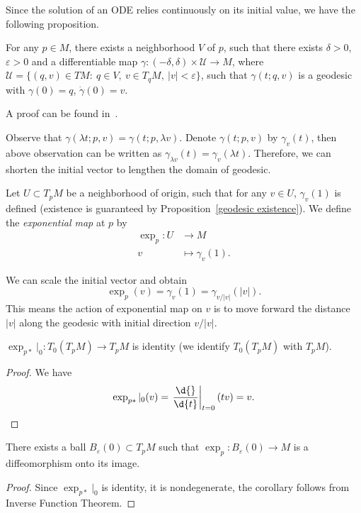 Since the solution of an ODE relies continuously on its initial value, we have the following proposition.
\begin{prop}\label{geodesic existence}
    For any $p\in M$, there exists a neighborhood $V$ of $p$, such that there exists $\delta>0$, $\varepsilon>0$ and a differentiable map $\gamma:(-\delta,\delta)\times\mathscr{U}\to M$, where $\mathscr{U}=\{(q,v)\in TM:\ q\in V,\ v\in T_qM,\ |v|<\varepsilon\}$, such that $\gamma(t;q,v)$ is a geodesic with $\gamma(0)=q$, $\dot\gamma(0)=v$.
\end{prop}
A proof can be found in~\cite[Chapter 3, Lemma 1]{Wu}.

Observe that $\gamma(\lambda t;p,v)=\gamma(t;p,\lambda v)$.
Denote $\gamma(t;p,v)$ by $\gamma_v(t)$, then above observation can be written as $\gamma_{\lambda v}(t)=\gamma_v(\lambda t)$.
Therefore, we can shorten the initial vector to lengthen the domain of geodesic.

\begin{defn}
    Let $U\subset T_pM$ be a neighborhood of origin, such that for any $v\in U$, $\gamma_v(1)$ is defined (existence is guaranteed by Proposition~\ref{geodesic existence}).
    We define the \emph{exponential map} at $p$ by
    \begin{align*}
        \exp_p:U&\to M\\
        v&\mapsto \gamma_v(1).
    \end{align*}
\end{defn}

\begin{rem}
    We can scale the initial vector and obtain
    \[\exp_p(v)=\gamma_v(1)=\gamma_{v/|v|}(|v|).\]
    This means the action of exponential map on $v$ is to move forward the distance $|v|$ along the geodesic with initial direction $v/|v|$.
\end{rem}

\begin{prop}\label{exp at 0}
    $\exp_{p*}|_0:T_0(T_pM)\to T_pM$ is identity (we identify $T_0(T_pM)$ with $T_pM$).
\end{prop}
\begin{proof}
    We have
    \[\exp_{p*}|_0(v)=\left.\frac{\d{}}{\d{t}}\right|_{t=0}(tv)=v.\qedhere\]
\end{proof}

\begin{cor}
    There exists a ball $B_\varepsilon(0)\subset T_pM$ such that $\exp_p:B_\varepsilon(0)\to M$ is a diffeomorphism onto its image.
\end{cor}
\begin{proof}
    Since $\exp_{p*}|_0$ is identity, it is nondegenerate, the corollary follows from Inverse Function Theorem.
\end{proof}

